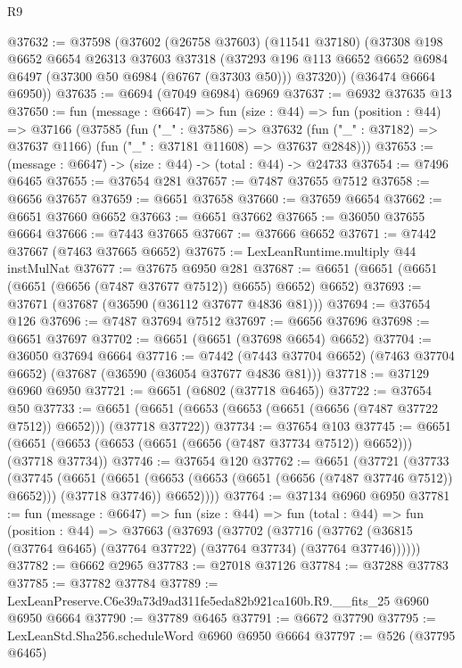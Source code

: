 \begin{lexlean}{R9}
\begin{coremodule}
@37632 := @37598
    (@37602
      (@26758 @37603)
      (@11541 @37180)
      (@37308
        @198
        @6652
        @6654
        @26313
        @37603
        @37318
        (@37293 @196 @113 @6652 @6652 @6984 @6497 (@37300 @50 @6984 (@6767 (@37303 @50))) @37320))
      (@36474 @6664 @6950))
@37635 := @6694 (@7049 @6984) @6969
@37637 := @6932 @37635 @13
@37650 := fun (message : @6647) =>
  fun (size : @44) =>
  fun (position : @44) =>
  @37166
    (@37585
      (fun ("_" : @37586) =>
      @37632 (fun ("_" : @37182) => @37637 @1166) (fun ("_" : @37181 @11608) => @37637 @2848)))
@37653 := (message : @6647) -> (size : @44) -> (total : @44) -> @24733
@37654 := @7496 @6465
@37655 := @37654 @281
@37657 := @7487 @37655 @7512
@37658 := @6656 @37657
@37659 := @6651 @37658
@37660 := @37659 @6654
@37662 := @6651 @37660 @6652
@37663 := @6651 @37662
@37665 := @36050 @37655 @6664
@37666 := @7443 @37665
@37667 := @37666 @6652
@37671 := @7442 @37667 (@7463 @37665 @6652)
@37675 := LexLeanRuntime.multiply @44 instMulNat
@37677 := @37675 @6950 @281
@37687 := @6651 (@6651 (@6651 (@6651 (@6656 (@7487 @37677 @7512)) @6655) @6652) @6652)
@37693 := @37671 (@37687 (@36590 (@36112 @37677 @4836 @81)))
@37694 := @37654 @126
@37696 := @7487 @37694 @7512
@37697 := @6656 @37696
@37698 := @6651 @37697
@37702 := @6651 (@6651 (@37698 @6654) @6652)
@37704 := @36050 @37694 @6664
@37716 := @7442
    (@7443 @37704 @6652)
    (@7463 @37704 @6652)
    (@37687 (@36590 (@36054 @37677 @4836 @81)))
@37718 := @37129 @6960 @6950
@37721 := @6651 (@6802 (@37718 @6465))
@37722 := @37654 @50
@37733 := @6651 (@6651 (@6653 (@6653 (@6651 (@6656 (@7487 @37722 @7512)) @6652))) (@37718 @37722))
@37734 := @37654 @103
@37745 := @6651 (@6651 (@6653 (@6653 (@6651 (@6656 (@7487 @37734 @7512)) @6652))) (@37718 @37734))
@37746 := @37654 @120
@37762 := @6651
    (@37721
      (@37733
        (@37745
          (@6651
            (@6651 (@6653 (@6653 (@6651 (@6656 (@7487 @37746 @7512)) @6652))) (@37718 @37746))
            @6652))))
@37764 := @37134 @6960 @6950
@37781 := fun (message : @6647) =>
  fun (size : @44) =>
  fun (total : @44) =>
  fun (position : @44) =>
  @37663
    (@37693
      (@37702
        (@37716 (@37762 (@36815 (@37764 @6465) (@37764 @37722) (@37764 @37734) (@37764 @37746))))))
@37782 := @6662 @2965
@37783 := @27018 @37126
@37784 := @37288 @37783
@37785 := @37782 @37784
@37789 := LexLeanPreserve.C6e39a73d9ad311fe5eda82b921ca160b.R9.__fits_25 @6960 @6950 @6664
@37790 := @37789 @6465
@37791 := @6672 @37790
@37795 := LexLeanStd.Sha256.scheduleWord @6960 @6950 @6664
@37797 := @526 (@37795 @6465)

\end{coremodule}
\end{lexlean}
